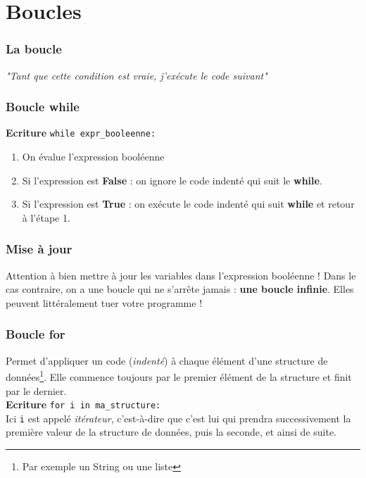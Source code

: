 \documentclass[handout]{beamer}
\begin{document}
\section{Boucles}
\begin{frame}
\frametitle{La boucle}
\textit{"Tant que cette condition est vraie, j'exécute le code suivant"}\\
\end{frame}
\begin{frame}
\frametitle{Boucle while}
\textbf{Ecriture } \texttt{while expr\_booleenne:}
\begin{enumerate}
\item On évalue l'expression booléenne
\item Si l'expression est \textbf{False} : on ignore le code indenté qui suit le \textbf{while}.
\item Si l'expression est \textbf{True} : on exécute le code indenté qui suit \textbf{while} et retour à l'étape 1.
\while
\end{enumerate} 
\end{frame}
\begin{frame}
\frametitle{Mise à jour}
Attention à bien mettre à jour les variables dans l'expression booléenne ! Dans le cas contraire, on a une boucle qui ne s'arrête jamais : \textbf{une boucle infinie}. Elles peuvent littéralement tuer votre programme !
\infini
\end{frame}
\begin{frame}
\frametitle{Boucle for}
Permet d'appliquer un code (\textit{indenté}) à chaque élément d'une structure de données\footnote{Par exemple un String ou une liste}. Elle commence toujours par le premier élément de la structure et finit par le dernier.\\
\textbf{Ecriture} \texttt{for i in ma\_structure:}\\
Ici \texttt{i} est appelé \textit{itérateur}, c'est-à-dire que c'est lui qui prendra successivement la première valeur de la structure de données, puis la seconde, et ainsi de suite.
\end{frame}
\end{document}
